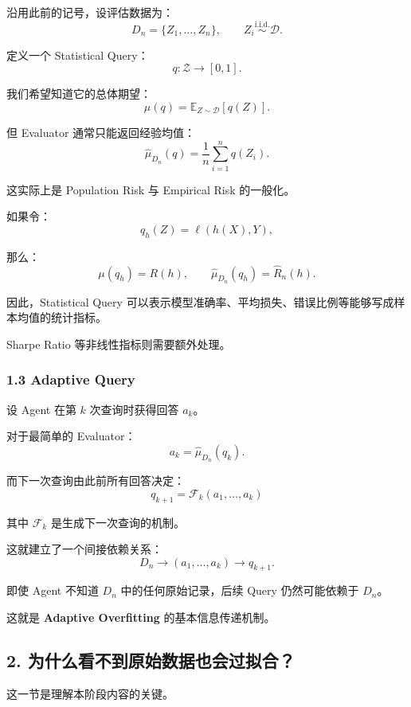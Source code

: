 沿用此前的记号，设评估数据为：
\[D_n=\{Z_1,\ldots,Z_n\},
\qquad Z_i\overset{\mathrm{i.i.d.}}{\sim}\mathcal D.\]

定义一个 Statistical Query：
\[q:\mathcal Z\to[0,1].\]

我们希望知道它的总体期望：
\[\mu(q)=\mathbb E_{Z\sim\mathcal D}[q(Z)].\]

但 Evaluator 通常只能返回经验均值：
\[\widehat\mu_{D_n}(q)
=
\frac1n\sum_{i=1}^{n}q(Z_i).\]

这实际上是 Population Risk 与 Empirical Risk 的一般化。

如果令：
\[q_h(Z)=\ell(h(X),Y),\]

那么：
\[\mu(q_h)=R(h),
\qquad
\widehat\mu_{D_n}(q_h)=\widehat R_n(h).\]

因此，Statistical Query 可以表示模型准确率、平均损失、错误比例等能够写成样本均值的统计指标。

Sharpe Ratio 等非线性指标则需要额外处理。

\hypertarget{part-2-20-0001-adaptive-query}{%
\subsubsection{1.3 Adaptive Query}\label{part-2-20-0001-adaptive-query}}

设 Agent 在第 \(k\) 次查询时获得回答 \(a_k\)。

对于最简单的 Evaluator：
\[a_k=\widehat\mu_{D_n}(q_k).\]

而下一次查询由此前所有回答决定：
\[\boxed{
q_{k+1}
=
\mathcal F_k(a_1,\ldots,a_k)
}\]

其中 \(\mathcal F_k\) 是生成下一次查询的机制。

这就建立了一个间接依赖关系：
\[D_n
\longrightarrow
(a_1,\ldots,a_k)
\longrightarrow
q_{k+1}.\]

即使 Agent 不知道 \(D_n\) 中的任何原始记录，后续 Query 仍然可能依赖于 \(D_n\)。

这就是 \textbf{Adaptive Overfitting} 的基本信息传递机制。

\hypertarget{part-2-20-0001-ux4e3aux4ec0ux4e48ux770bux4e0dux5230ux539fux59cbux6570ux636eux4e5fux4f1aux8fc7ux62dfux5408}{%
\subsection{2. 为什么看不到原始数据也会过拟合？}\label{part-2-20-0001-ux4e3aux4ec0ux4e48ux770bux4e0dux5230ux539fux59cbux6570ux636eux4e5fux4f1aux8fc7ux62dfux5408}}

这一节是理解本阶段内容的关键。

